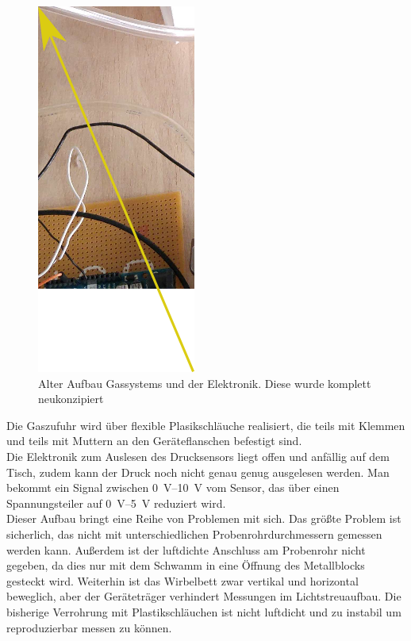 \begin{figure}[h]
	\begin{center}
		\includegraphics[scale=0.7]{Altes_Wirbelbett_oben.png}
		\caption{Alter Aufbau Gassystems und der Elektronik. Diese wurde komplett neukonzipiert}
	\end{center}
\end{figure}	


Die Gaszufuhr wird über flexible Plasikschläuche realisiert, die teils mit Klemmen und teils mit Muttern an den Geräteflanschen befestigt sind. \\
Die Elektronik zum Auslesen des Drucksensors liegt offen und anfällig auf dem Tisch, zudem kann der Druck noch nicht genau genug ausgelesen werden. Man bekommt ein Signal zwischen \SIrange{0}{10}{\volt} vom Sensor, das über einen Spannungsteiler auf \SIrange{0}{5}{\volt} reduziert wird. \\
Dieser Aufbau bringt eine Reihe von Problemen mit sich. Das größte Problem ist sicherlich, das nicht mit unterschiedlichen Probenrohrdurchmessern gemessen werden kann. Außerdem ist der luftdichte Anschluss am Probenrohr nicht gegeben, da dies nur mit dem Schwamm in eine Öffnung des Metallblocks gesteckt wird.
Weiterhin ist das Wirbelbett zwar vertikal und horizontal beweglich, aber der Geräteträger verhindert Messungen im Lichtstreuaufbau.
Die bisherige Verrohrung mit Plastikschläuchen ist nicht luftdicht und zu instabil um reproduzierbar messen zu können. \\


